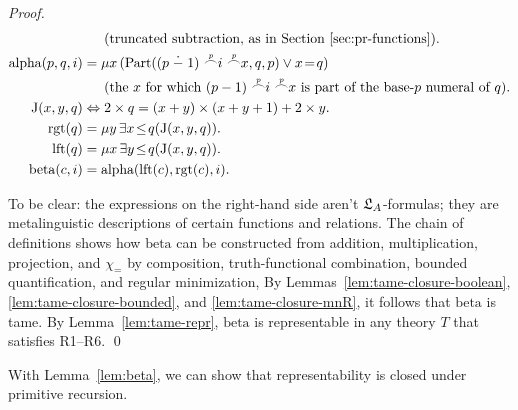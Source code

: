 \begin{proof}
\begin{align*}
                &\quad \text{\;\;(truncated subtraction, as in Section~\ref{sec:pr-functions})}.\\
    \mathrm{alpha}(p,q,i) &= \mu x\, (\mathrm{Part}((p \dotminus 1) \pconcat i \pconcat x, q, p) \lor x\!=\!q)\\
                &\quad \text{\;\;(the $x$ for which $(p-1) \pconcat i \pconcat x$ is part of the base-$p$ numeral of $q$)}.\\
    \mathrm{J}(x,y,q) &\Leftrightarrow 2 \times q = (x+y) \times (x+y+1) + 2\times y.\\
    \mathrm{rgt}(q) &= \mu y\, \exists x\!\le\!q(\mathrm{J}(x,y,q)).\\
    \mathrm{lft}(q) &= \mu x\, \exists y\!\le\!q(\mathrm{J}(x,y,q)).\\
    \mathrm{beta}(c,i) &= \text{alpha}(\mathrm{lft}(c),\mathrm{rgt}(c),i).
  \end{align*}
  
    \endgroup

  \vspace{-.5\baselineskip}
  
  To be clear:
  the expressions on the right-hand side aren't $\mathfrak{L}_{A}$-formulas;
  they are metalinguistic descriptions of certain functions and relations.
  The chain of definitions shows
  how $\mathrm{beta}$ can be constructed from
  addition, multiplication, projection, and $\chi_=$
  by composition, truth-functional combination, bounded quantification, and regular minimization,
  By Lemmas~\ref{lem:tame-closure-boolean}, \ref{lem:tame-closure-bounded}, and \ref{lem:tame-closure-mnR},
  it follows that $\mathrm{beta}$ is tame.
  By Lemma~\ref{lem:tame-repr},
  $\mathrm{beta}$ is representable in any theory $T$ that satisfies R1--R6.
  \qed
\end{proof}

With Lemma~\ref{lem:beta},
we can show that representability is closed under primitive recursion.


